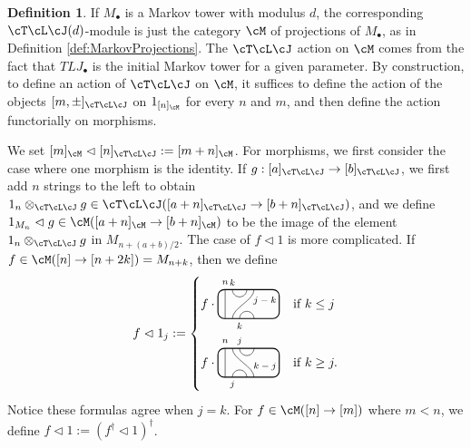 \documentclass[11pt]{article}
\theoremstyle{plain}
\theoremstyle{definition}
\newtheorem{defn}[thm]{Definition}
\newcommand{\nn}[1]{\textcolor{red}{[[#1]]}}
\newcommand{\TLJ}{\cT\cL\cJ}
\newcommand{\TLPlusPIso}[3]{
 \TLTStart
 \TLTThrough{#1}
 \TLTSnakeR{#2}{#3}
 \TLTEnd
}
\newcommand{\TLMinusPIso}[3]{
 \TLTStart
 \TLTThrough{#1}
 \TLTSnakeL{#2}{#3}
 \TLTEnd
}
\newcommand{\TLTCalcLabelOffset}[3][0cm]{
 \settowidth{#2}{\scriptsize{$#3$}}
 \setlength{#2}{.5#2}
 \setlength{#2}{\maxof{#2}{#1}}
}
\newcommand{\TLTEnd}{
 \draw[thick, rounded corners = 5pt] (0,0) rectangle ($ (TLTlead) + (0,.8) $);
 \end{tikzpicture}
}
\newcommand{\TLTStart}{
 \begin{tikzpicture}[baseline=.3cm]
 \coordinate (TLTlead) at (.2,0); %
 \let\TLTlabelwidth\relax
 \newlength{\TLTlabelwidth}
}
\newcommand{\TLTThrough}[1]{
 \TLTCalcLabelOffset[.2cm]{\TLTlabelwidth}{#1}
 \coordinate (TLTlead) at ($ (TLTlead) + ({\TLTlabelwidth},0) $);
 \begin{scope}[shift=(TLTlead)]
  \draw (0,0) -- (0,.8);
  \node at (0,1) {\scriptsize{$#1$}};
 \end{scope}
  \coordinate (TLTlead) at ($ (TLTlead) + ({\TLTlabelwidth},0) $);
}
\newcommand{\TLTSnakeR}[2]{
 \let\TLTscwidth\relax
 \newlength{\TLTscwidth}
 \let\TLTsswidth\relax
 \newlength{\TLTsswidth}
 \TLTCalcLabelOffset[.2cm]{\TLTscwidth}{#1}
 \TLTCalcLabelOffset[.5cm]{\TLTsswidth}{#2}
 \setlength{\TLTlabelwidth}{\TLTscwidth+\TLTsswidth}
 \setlength{\TLTlabelwidth}{\maxof{\TLTlabelwidth}{.7cm}} %
 \coordinate (TLTlead) at ($ (TLTlead) + ({\TLTscwidth},0) $);
 \begin{scope}[shift=(TLTlead)]
  \draw (.1,.8) arc (-180:0:.2cm);
  \draw (.1,0) .. controls ++(90:.3cm) and ++(270:.3cm) .. ($ (.1,.8) + ({\TLTlabelwidth},0) $);
  \draw ($ (.1,0) + ({\TLTsswidth},0) $) arc (180:0:.2cm);
  \node at (.1,1) {\scriptsize{$#1$}};
  \node at ($ (.1,1) + ({\TLTlabelwidth},0) $) {\scriptsize{$#2$}};
  \node at ($ (.1,-.2) + ({\TLTsswidth},0) $) {\scriptsize{$#1$}};
 \end{scope}
 \coordinate (TLTlead) at ($ (TLTlead) + ({\TLTlabelwidth+\TLTsswidth},0) $);
}
\newcommand{\TLTSnakeL}[2]{
 \let\TLTscwidth\relax
 \newlength{\TLTscwidth}
 \let\TLTsswidth\relax
 \newlength{\TLTsswidth}
 \TLTCalcLabelOffset[.2cm]{\TLTscwidth}{#1}
 \TLTCalcLabelOffset[.1cm]{\TLTsswidth}{#2}
 \setlength{\TLTlabelwidth}{\TLTscwidth+\TLTsswidth}
 \setlength{\TLTlabelwidth}{\maxof{\TLTlabelwidth}{.5cm}} %
 \coordinate (TLTlead) at ($ (TLTlead) + ({\TLTsswidth},0) $);
 \begin{scope}[shift=(TLTlead)]
  \draw ($ (.1,.8) + ({\TLTsswidth+\TLTscwidth},0) $) arc (-180:0:.2cm);
  \draw ($ (.1,0) + ({\TLTlabelwidth},0) $) .. controls ++(90:.3cm) and ++(270:.3cm) .. (.1,.8);
  \draw (.1,0) arc (180:0:.2cm);
  \node at ($ (.1,1) + ({\TLTsswidth+\TLTscwidth},0) $) {\scriptsize{$#1$}};
  \node at (.1,1) {\scriptsize{$#2$}};
  \node at (.1,-.2) {\scriptsize{$#1$}};
 \end{scope}
 \setlength{\TLTscwidth}{\maxof{\TLTscwidth}{.5cm}} %
 \coordinate (TLTlead) at ($ (TLTlead) + ({\TLTlabelwidth+\TLTscwidth},0) $);
}
\begin{document}
\begin{defn}
\label{def:ModuleFromMarkovTower}
 If $M_\bullet$ is a Markov tower with modulus $d$, the corresponding $\cT\cL\cJ(d)$-module is just the category $\cM$ of projections of $M_\bullet$, as in Definition \ref{def:MarkovProjections}.  
The $\TLJ$ action on $\cM$ comes from the fact that $TLJ_\bullet$ is the initial Markov tower for a given parameter. %
By construction, to define an action of $\TLJ$ on $\cM$, it suffices to define the action of the objects $[m,\pm]_{\cT\cL\cJ}$ on $1_{[n]_\cM}$ for every $n$ and $m$, and then define the action functorially on morphisms. 
 
We set $[m]_\cM\vartriangleleft [n]_{\TLJ}:=[m+n]_\cM$. 
For morphisms, we first consider the case where one morphism is the identity. 
 If $g:[a]_{\TLJ}\to[b]_{\TLJ}$, we first add $n$ strings to the left to obtain $1_n \otimes_{\TLJ} g \in \TLJ([a+n]_{\TLJ} \to [b+n]_{\TLJ})$, and we define $1_{M_n}\vartriangleleft g\in \cM([a+n]_\cM \to [b+n]_\cM)$ to be the image of the element $1_n \otimes_{\TLJ} g$ in $M_{n+(a+b)/2}$. 
 The case of $f\vartriangleleft 1$ is more complicated. 
 If $f\in \cM([n]\to [n+2k])=M_{n+k}$, then we define 
\[
f\vartriangleleft 1_{j}
:=
\begin{cases}
f\cdot
 \begin{tikzpicture}[baseline=.3cm]
  \draw (.2,0) -- (.2,.8);
  \node at (.2,1) {\scriptsize{$n$}};
  \draw (.6,0) arc (180:0:.2cm);
  \node at (.6,-.2) {\scriptsize{$k$}};
  \draw (.4,0) .. controls ++(90:.3cm) and ++(270:.3cm) .. (1,.8);
  \node at (1.3,.5) {\scriptsize{$j-k$}};
  \draw (.4,.8) arc (-180:0:.2cm);
  \node at (.4,1) {\scriptsize{$k$}};
  \draw[thick, rounded corners = 5pt] (0,0) rectangle (1.7,.8);
 \end{tikzpicture}
&
\text{if }k\leq j
\\
f\cdot
 \begin{tikzpicture}[baseline=.3cm]
  \draw (.2,0) -- (.2,.8);
  \node at (.2,1) {\scriptsize{$n$}};
  \draw (.4,0) arc (180:0:.2cm);
  \node at (.4,-.2) {\scriptsize{$j$}};
  \draw (1,0) .. controls ++(90:.3cm) and ++(270:.3cm) .. (.4,.8);
  \node at (1.3,.3) {\scriptsize{$k-j$}};
  \draw (.6,.8) arc (-180:0:.2cm);
  \node at (.6,1) {\scriptsize{$j$}};
  \draw[thick, rounded corners = 5pt] (0,0) rectangle (1.7,.8);
 \end{tikzpicture}
&
\text{if }k\geq j.
\end{cases}
\]
Notice these formulas agree when $j=k$.
For $f\in \cM([n]\to[m])$ where $m<n$, we define $f\vartriangleleft 1 := (f^\dag \vartriangleleft 1)^\dag$.
 

\end{defn}
\end{document}
